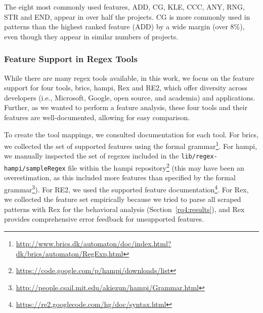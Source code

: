 The eight most commonly used features, ADD, CG, KLE, CCC, ANY, RNG, STR and END,
appear in over half the projects. %
CG is more commonly used in patterns than the highest ranked feature (ADD) by a wide margin (over 8\%), even though they appear in similar numbers of projects.

\subsubsection{Feature Support in Regex Tools}
\label{regextoolsresults}
While there are many regex tools available, in this work, we focus on the feature support for  four tools, brics, hampi, Rex and RE2, which offer diversity across developers (i.e., Microsoft, Google, open source, and academia) and applications. Further, as we wanted to perform a feature analysis, these four tools and their features are well-documented, allowing for easy comparison.

To create the tool mappings, we consulted documentation for each tool. For brics, we collected the set of supported features using the formal grammar\footnote{\url{http://www.brics.dk/automaton/doc/index.html?dk/brics/automaton/RegExp.html}}.  For hampi, we manually inspected the set of regexes included in the {\tt lib/regex-hampi/sampleRegex} file within the hampi repository\footnote{\url{https://code.google.com/p/hampi/downloads/list}} (this may have been an overestimation, as this included more features than specified by the formal grammar\footnote{\url{http://people.csail.mit.edu/akiezun/hampi/Grammar.html}}).  For RE2, we used the  supported feature documentation\footnote{\url{https://re2.googlecode.com/hg/doc/syntax.html}}.  For Rex, we collected the feature set empirically because we tried to parse all scraped patterns with Rex for the behavioral analysis (Section~\ref{rq4:results}), and Rex provides comprehensive error feedback for unsupported features.




